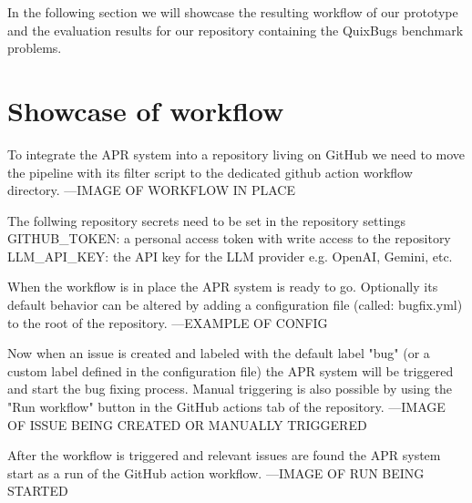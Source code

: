 In the following section we will showcase the resulting workflow of our prototype and the evaluation results for our repository containing the QuixBugs benchmark problems.
\section{Showcase of workflow}

To integrate the APR system into a repository living on GitHub we need to move the pipeline with its filter script to the dedicated github action workflow directory.
---IMAGE OF WORKFLOW IN PLACE

The follwing repository secrets need to be set in the repository settings GITHUB\_TOKEN: a personal access token with write access to the repository LLM\_API\_KEY: the API key for the LLM provider e.g. OpenAI, Gemini, etc.

When the workflow is in place the APR system is ready to go. Optionally its default behavior can be altered by adding a configuration file (called: bugfix.yml) to the root of the repository.
---EXAMPLE OF CONFIG

Now when an issue is created and labeled with the default label "bug" (or a custom label defined in the configuration file) the APR system will be triggered and start the bug fixing process. Manual triggering is also possible by using the "Run workflow" button in the GitHub actions tab of the repository.
---IMAGE OF ISSUE BEING CREATED OR MANUALLY TRIGGERED

After the workflow is triggered and relevant issues are found the APR system start as a run of the GitHub action workflow.
---IMAGE OF RUN BEING STARTED

